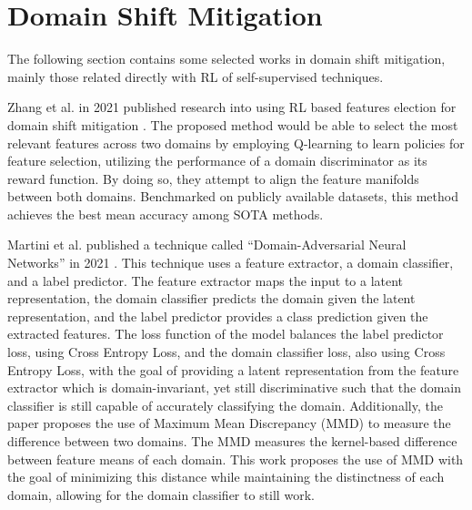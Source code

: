 \section{Domain Shift Mitigation}

The following section contains some selected works in domain shift mitigation, mainly those related directly with RL of self-supervised techniques.

Zhang et al. in 2021 published research into using RL based features election for domain shift mitigation \cite{zhang2021adversarial}.
The proposed method would be able to select the most relevant features across two domains by employing Q-learning to learn policies for feature selection, utilizing the performance of a domain discriminator as its reward function.
By doing so, they attempt to align the feature manifolds between both domains.
Benchmarked on publicly available datasets, this method achieves the best mean accuracy among SOTA methods.

Martini et al. published a technique called ``Domain-Adversarial Neural Networks'' in 2021 \cite{martini2021domain}.
This technique uses a feature extractor, a domain classifier, and a label predictor.
The feature extractor maps the input to a latent representation, the domain classifier predicts the domain given the latent representation, and the label predictor provides a class prediction given the extracted features.
The loss function of the model balances the label predictor loss, using Cross Entropy Loss, and the domain classifier loss, also using Cross Entropy Loss, with the goal of providing a latent representation from the feature extractor which is domain-invariant, yet still discriminative such that the domain classifier is still capable of accurately classifying the domain.
Additionally, the paper proposes the use of Maximum Mean Discrepancy (MMD) to measure the difference between two domains.
The MMD measures the kernel-based difference between feature means of each domain.
This work proposes the use of MMD with the goal of minimizing this distance while maintaining the distinctness of each domain, allowing for the domain classifier to still work.